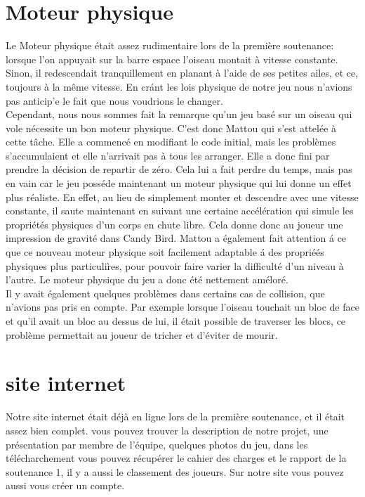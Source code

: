 \documentclass [11pt]{report}
\begin{document}
	\section{Moteur physique}
		Le Moteur physique \'etait assez rudimentaire lors de la premi\`ere soutenance: lorsque l'on appuyait sur la barre espace l'oiseau montait \`a vitesse constante. Sinon, il redescendait tranquillement en planant \`a l'aide de ses petites ailes, et ce, toujours \`a la m\^eme vitesse. En cr\'ant les lois physique de notre jeu nous n'avions pas anticip'e le fait que nous voudrions le changer.\\
		\indent Cependant, nous nous sommes fait la remarque qu'un jeu bas\'e sur un oiseau qui vole n\'ecessite un bon moteur physique. C'est donc Mattou qui s'est attel\'ee \`a cette t\^ache. Elle a commenc\'e en modifiant le code initial, mais les probl\`emes s'accumulaient et elle n'arrivait pas \`a tous les arranger. Elle a donc fini par prendre la d\'ecision de repartir de z\'ero. Cela lui a fait perdre du temps, mais pas en vain car le jeu poss\'ede maintenant un moteur physique qui lui donne un effet plus r\'ealiste. En effet, au lieu de simplement monter et descendre avec une vitesse constante, il saute maintenant en suivant une certaine acc\'el\'eration qui simule les propri\'et\'es physiques d'un corps en chute libre. Cela donne donc au joueur une impression de gravit\'e dans Candy Bird. Mattou a \'egalement fait attention \'a ce que ce nouveau moteur physique soit facilement adaptable \'a des propri\'e\'es physiques plus particuli\`res, pour pouvoir faire varier la difficult\'e d'un niveau \`a l'autre. Le moteur physique du jeu a donc \'et\'e nettement am\'elor\'e. \\
		\indent Il y avait \'egalement quelques probl\`emes dans certains cas de collision, que n'avions pas pris en compte. Par exemple lorsque l'oiseau touchait un bloc de face et qu'il avait un bloc au dessus de lui, il \'etait possible de traverser les blocs, ce probl\`eme permettait au joueur de tricher et d'\'eviter de mourir.
	\section{site internet}
		Notre site internet \'etait d\'ej\`a en ligne lors de la premi\`ere soutenance, et il \'etait assez bien complet. vous pouvez trouver la description de notre projet, une pr\'esentation par membre de l'\'equipe, quelques photos du jeu, dans les t\'el\'echarchement vous pouvez r\'ecup\'erer le cahier des charges et le rapport de la soutenance 1, il y a aussi le classement des joueurs. Sur notre site vous pouvez aussi vous cr\'eer un compte.
\end{document}
